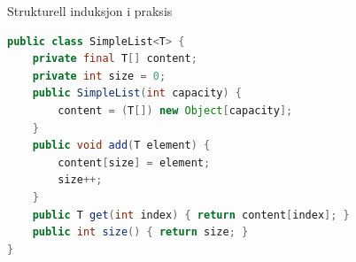 \begin{frame}[fragile]{Strukturell induksjon i praksis}
    \begin{lstlisting}[language=Java]
public class SimpleList<T> {
    private final T[] content;
    private int size = 0;
    public SimpleList(int capacity) {
        content = (T[]) new Object[capacity];
    }
    public void add(T element) {
        content[size] = element;
        size++;
    }
    public T get(int index) { return content[index]; }
    public int size() { return size; }
}
    \end{lstlisting}
\end{frame}
